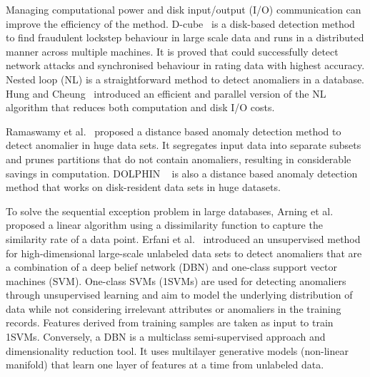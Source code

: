 Managing computational power and disk input/output (I/O) communication can
improve the efficiency of the method.
D-cube~\cite{shin2017d} is a disk-based detection method to 
find fraudulent lockstep behaviour in large scale data and
runs in a distributed manner across multiple machines.
It is proved that could successfully
detect network attacks and
synchronised behaviour in rating data
with highest accuracy.
Nested loop (NL)\cite{knox1998algorithms} is
a straightforward method to detect anomaliers in a database.
Hung and Cheung~\cite{hung2002parallel} introduced an
efficient and parallel version
of the NL algorithm that reduces both computation and disk I/O costs.

Ramaswamy et al.~\cite{ramaswamy2000efficient} proposed a 
distance based  anomaly detection method to detect anomalier in huge data sets.
It segregates input data into
separate subsets and prunes partitions that 
do not contain anomaliers,
resulting in considerable
savings in computation.
DOLPHIN ~\cite{angiulli2007very} is also a
distance based anomaly detection method
that works on disk-resident data sets in huge datasets.

To solve the sequential exception problem in large databases,
Arning et al.~\cite{arning1996linear} proposed a linear algorithm
using a dissimilarity function to capture the
similarity rate of a data point.
Erfani et al.~\cite{erfani2016high} introduced
an unsupervised method for high-dimensional large-scale
unlabeled data sets to detect anomaliers that
are a combination of a deep belief network (DBN) and one-class
support vector machines (SVM).
One-class SVMs (1SVMs) are used for detecting anomaliers
through unsupervised learning and aim to
model the underlying distribution of data while
not considering irrelevant attributes or
anomaliers in the training records.
Features derived from training samples are taken as input to train 1SVMs.
Conversely,
a DBN is
a multiclass semi-supervised approach and dimensionality reduction tool.
It uses multilayer
generative models (non-linear manifold) that learn one layer of features at a time
from unlabeled data.


